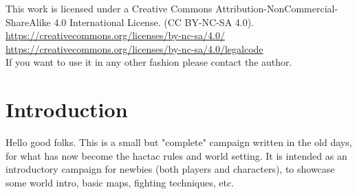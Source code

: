 \documentclass[11pt, twoside, titlepage, a4paper]{report}
\renewcommand{\chaptermark}[1]{\markboth{#1}{}}
\begin{document}


\vspace*{\fill}

This work is licensed under a Creative Commons Attribution-NonCommercial-ShareAlike 4.0 International License. (CC BY-NC-SA 4.0).\\
\url{https://creativecommons.org/licenses/by-nc-sa/4.0/} \\
\url{https://creativecommons.org/licenses/by-nc-sa/4.0/legalcode} \\
If you want to use it in any other fashion please contact the author.

\vspace*{\fill}


\thispagestyle{empty} %
\cleardoublepage %
\tableofcontents %
\newpage



\setcounter{secnumdepth}{-1}























\clearpage
{}
\section*{Introduction}
\chaptermark{introduction}
Hello good folks. This is a small but "complete" campaign written in the old days, for what has now become the hactac rules and world setting. It is intended as an introductory campaign for newbies (both players and characters), to showcase some world intro, basic maps, fighting techniques, etc.
\end{document}

